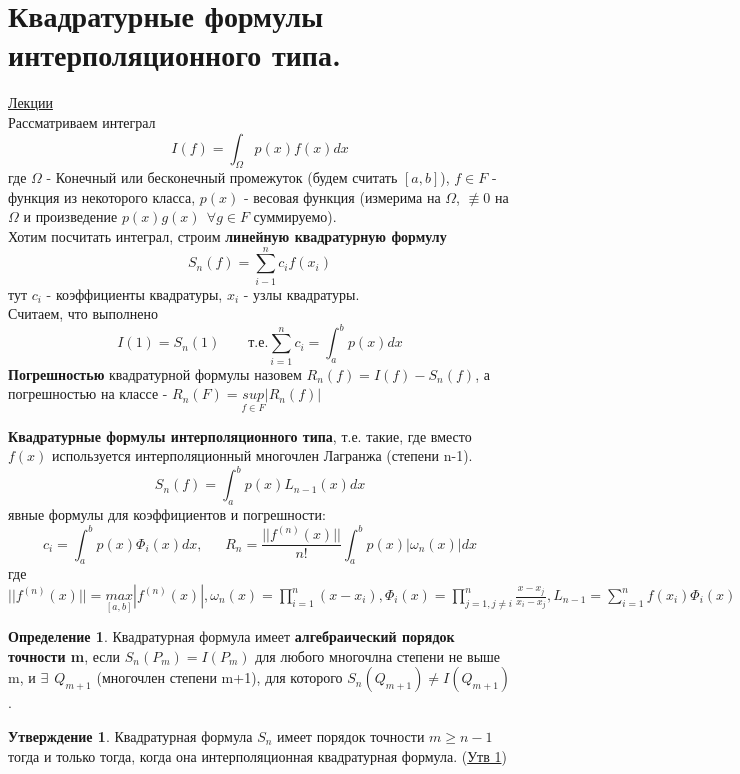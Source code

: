 \documentclass[specialist, subf, href, colorlinks=true, 12pt, times, mtpro, final]{disser}
\theoremstyle{definition}
\newtheorem{defn}{Определение}[section]
\newtheorem{state}{Утверждение}[section]
\begin{document}
\section {Квадратурные формулы интерполяционного типа.}
    \hyperlink {lects.37}{Лекции}\\
    Рассматриваем интеграл
    $$
        I(f) = \int_{\Omega}p(x)f(x)dx
    $$
    где $\Omega$ - Конечный или бесконечный промежуток (будем считать $[a,b]$), $f \in F$ - функция из некоторого класса, $p(x)$ - весовая функция (измерима на $\Omega$, $\not\equiv 0$ на $\Omega$ и произведение $p(x)g(x) \ \ \forall g \in F$ суммируемо). \\
    Хотим посчитать интеграл, строим \textbf{линейную квадратурную формулу}
    $$
        S_n(f) = \sum\limits_{i - 1}^{n} c_if(x_i)
    $$
    тут $c_i$ - коэффициенты квадратуры, $x_i$ - узлы квадратуры.\\
    Считаем, что выполнено 
    $$
        I(1) = S_n(1) \ \ \ \ \ \ \ \ \ \text{т.е.} \sum\limits_{i = 1}^n c_i = \int_a^b p(x) dx
    $$
    \textbf{Погрешностью} квадратурной формулы назовем $R_n(f) = I(f) - S_n(f)$, а погрешностью на классе - $R_n(F) = \underset{f\in F}{sup} |R_n(f)|$
    
    \textbf{Квадратурные формулы интерполяционного типа}, т.е. такие, где вместо $f(x)$ используется интерполяционный многочлен Лагранжа (степени n-1).
    $$
        S_n(f) = \int_a^b p(x) L_{n-1}(x) dx
    $$
    явные формулы для коэффициентов и погрешности:
    $$
        c_i = \int_a^b p(x)\Phi_i (x) dx, \ \ \ \ \ \ \ R_n = \frac{||f^{(n)}(x)||}{n!} \int_a^b p(x)|\omega_n(x)| dx
    $$
    где $||f^{(n)}(x)|| = \underset{[a,b]}{max}|f^{(n)}(x)|, \omega_n(x) = \prod\limits_{i = 1}^n (x - x_i), \Phi_i(x) = \prod\limits_{j = 1, j\ne i}^n \frac{x - x_j}{x_i - x_j}, L_{n-1} = \sum\limits_{i = 1}^n f(x_i) \Phi_i(x)$ \\
    
    \begin{defn}
        Квадратурная формула имеет \textbf{алгебраический порядок точности  m}, если $S_n(P_m) = I(P_m)$ для любого многочлна степени не выше m, и $\exists \ \ Q_{m+1}$ (многочлен степени m+1), для которого $S_n(Q_{m+1}) \ne I(Q_{m+1})$. 
    \end{defn}
    \begin{state}
        Квадратурная формула $S_n$ имеет порядок точности $m \ge n-1$ тогда и только тогда, когда она интерполяционная квадратурная формула. (\hyperlink {lects.38}{Утв 1})
    \end{state}
\end{document}

